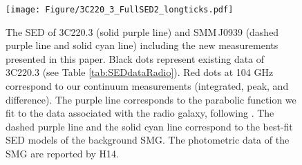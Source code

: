 \documentclass[twocolumn,apj,numberedappendix]{emulateapj}
\begin{document}
\begin{figure}[!tbph]
\centering
\texttt{[image: Figure/3C220\_3\_FullSED2\_longticks.pdf]}
\caption{The SED of 3C220.3 (solid purple line) and SMM\,J0939 (dashed purple line and solid cyan line) including the new measurements presented in this paper. 
Black dots represent existing data of 3C220.3 (see Table \ref{tab:SEDdataRadio}). Red dots at 104 GHz correspond to 
our continuum measurements (integrated, peak, and difference). The purple line corresponds to the parabolic function we 
fit to the data associated with the radio galaxy, following \citet{Cleary07a}. The dashed purple line and 
the solid cyan line correspond to the best-fit SED models of the background SMG. The photometric data of the SMG are reported by H14. \label{fig:SED}}
\end{figure}
\end{document}
